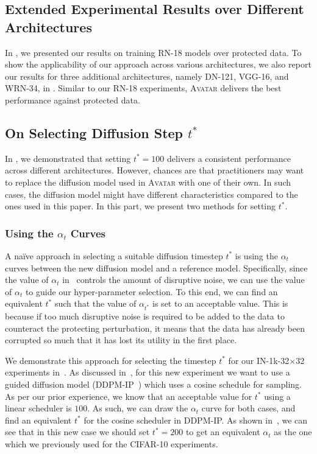 \documentclass[conference]{IEEEtran}
\theoremstyle{definition}
\theoremstyle{remark}
\theoremstyle{proposition}
\begin{document}
\newpage
\subsection{Extended Experimental Results over Different Architectures}
In , we presented our results on training RN-18 models over protected data. 
To show the applicability of our approach across various architectures, we also report our results for three additional architectures, namely DN-121, VGG-16, and WRN-34, in .
Similar to our RN-18 experiments, \textsc{Avatar} delivers the best performance against protected data.

\subsection{On Selecting Diffusion Step $t^{*}$}\label{sec:additional_experiments:selection}
In , we demonstrated that setting $t^{*}=100$ delivers a consistent performance across different architectures.
However, chances are that practitioners may want to replace the diffusion model used in \textsc{Avatar} with one of their own.
In such cases, the diffusion model might have different characteristics compared to the ones used in this paper.
In this part, we present two methods for setting $t^{*}$.

\subsubsection{Using the $\alpha_{t}$ Curves}
A na\"ive approach in selecting a suitable diffusion timestep $t^{*}$ is using the $\alpha_{t}$ curves between the new diffusion model and a reference model.
Specifically, since the value of $\alpha_{t}$ in~ controls the amount of disruptive noise, we can use the value of $\alpha_{t}$ to guide our hyper-parameter selection.
To this end, we can find an equivalent $t^{*}$ such that the value of $\alpha_{t^{*}}$ is set to an acceptable value.
This is because if too much disruptive noise is required to be added to the data to counteract the protecting perturbation, it means that the data has already been corrupted so much that it has lost its utility in the first place.

We demonstrate this approach for selecting the timestep $t^{*}$ for our IN-1k-32$\times$32 experiments in~.
As discussed in~, for this new experiment we want to use a guided diffusion model (DDPM-IP~\citep{ning2023ddpmip}) which uses a cosine schedule for sampling.
As per our prior experience, we know that an acceptable value for $t^{*}$ using a linear scheduler is $100$.
As such, we can draw the $\alpha_t$ curve for both cases, and find an equivalent $t^{*}$ for the cosine scheduler in DDPM-IP.
As shown in~, we can see that in this new case we should set $t^{*}=200$ to get an equivalent $\alpha_t$ as the one which we previously used for the CIFAR-10 experiments.
\end{document}
